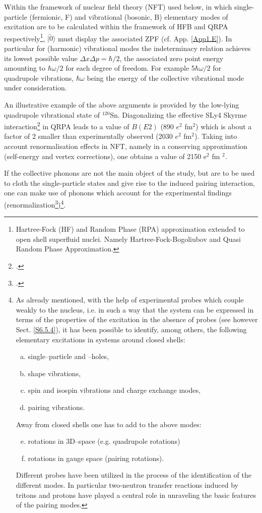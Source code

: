 Within the framework of nuclear field theory (NFT) used below, in which single-particle (fermionic, F) and vibrational
(bosonic, B) elementary modes of excitation are to be calculated within the framework of HFB and QRPA
respectively\footnote{Hartree-Fock (HF) and Random Phase (RPA) approximation extended to open shell superfluid nuclei. Namely Hartree-Fock-Bogoliubov and Quasi Random Phase Approximation.}, $|\tilde 0\rangle  $ must display the associated ZPF (cf. App. \ref{App1.E}). In particular for (harmonic) vibrational modes the indeterminacy relation achieves its lowest possible value 
$\Delta x \Delta p = \hbar/2$, the associated zero point energy amounting to $\hbar \omega/2$
for each degree of freedom. For example 5$\hbar \omega/2$ for quadrupole vibrations, 
$\hbar \omega$ being the energy of the collective vibrational mode under consideration. 




An illustrative example of the above arguments is provided by the low-lying quadrupole vibrational state of $^{120}$Sn. 
Diagonalizing the effective SLy4 Skyrme interaction\footnote{\cite{Ring:80}.} in QRPA leads to a value of $B(E2)$
(890 $e^2$ fm$^2$) which is about a factor of 2 smaller than experimentally observed (2030 $e^2$ fm$^2$). 
Taking into account  renormalisation effects in NFT, 
namely in a conserving  approximation (self-energy and vertex corrections),   one obtains a value of 2150 e$^2$ fm $^2$. 


If the collective phonons are not the main object  of the study, but are to be used to cloth the single-particle states 
and give rise to the induced pairing interaction, one can make 
use of phonons which account for the experimental findings (renormalization\footnote{\cite{Idini:15,Broglia:16,Barranco:17}.})\footnote{As already mentioned, with the help of experimental probes which couple weakly to the nucleus,
i.e. in such a way that the system can be expressed in terms of the properties
of the excitation in the absence of probes (see however Sect. \ref{S6.5.4}), it has been possible to identify, among others, the
following elementary excitations in systems around closed shells:
\begin{enumerate}[a)]
\item single--particle and --holes,
\item shape vibrations,
\item spin and isospin vibrations and charge exchange modes,
\item pairing vibrations.
\end{enumerate}
Away from closed shells one has to add to the above modes:
\begin{enumerate}[a)]
\setcounter{enumi}{4}
\item rotations in 3D--space (e.g. quadrupole rotations)
\item rotations in gauge space (pairing rotations).
\end{enumerate}
Different probes have been utilized in the process of the identification of the different modes. In particular two-neutron transfer reactions induced by tritons
and protons have played a central role in unraveling the basic features of the pairing modes.}.





